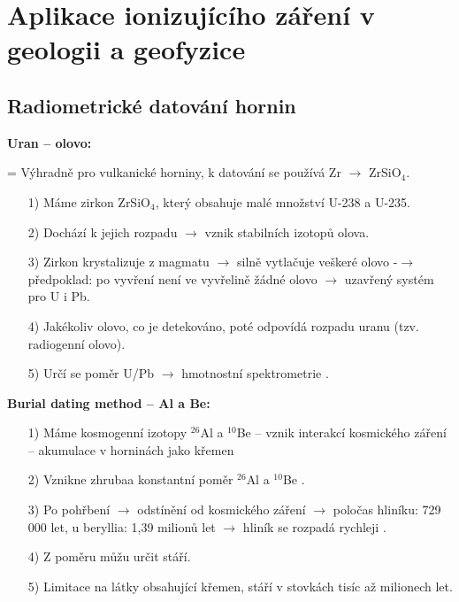 \section[Aplikace ionizujícího záření v geologii a geofyzice]{Aplikace ionizujícího záření v geologii a geofyzice}

\subsection{Radiometrické datování hornin}

\textbf{Uran -- olovo:}

= Výhradně pro vulkanické horniny, k datování se používá Zr $\rightarrow$ ZrSiO$_4$.

\begin{itemize}
    \item[1)] Máme zirkon ZrSiO$_4$, který obsahuje malé množství U-238 a U-235.
    \item[2)] Dochází k jejich rozpadu $\rightarrow$ vznik stabilních izotopů olova.
    \item[3)] Zirkon krystalizuje z magmatu $\rightarrow$ silně vytlačuje veškeré olovo -$\rightarrow$ předpoklad: po vyvření není ve vyvřelině žádné olovo $\rightarrow$ uzavřený systém pro U i Pb.    
    \item[4)] Jakékoliv olovo, co je detekováno, poté odpovídá rozpadu uranu (tzv. radiogenní olovo).
    \item[5)] Určí se poměr U/Pb $\rightarrow$ hmotnostní spektrometrie .
\end{itemize}

\textbf{Burial dating method -- Al a Be:}

\begin{itemize}
    \item[1)] Máme kosmogenní izotopy $^{26}$Al a $^{10}$Be -- vznik interakcí kosmického záření -- akumulace v horninách jako křemen
    \item[2)] Vznikne zhrubaa konstantní poměr $^{26}$Al a $^{10}$Be .
    \item[3)] Po pohřbení $\rightarrow$ odstínění od kosmického záření $\rightarrow$ poločas hliníku: 729 000 let, u beryllia: 1,39 milionů let $\rightarrow$ hliník se rozpadá rychleji .
    \item[4)] Z poměru můžu určit stáří.
    \item[5)] Limitace na látky obsahující křemen, stáří v stovkách tisíc až milionech let.
\end{itemize}

